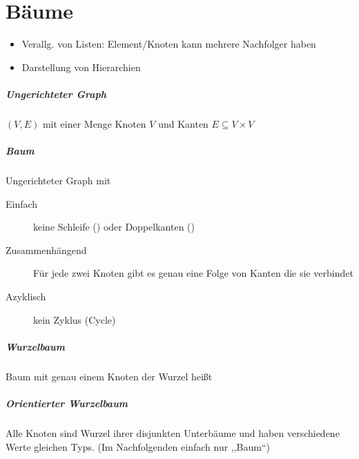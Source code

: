 \chapter{Bäume}

\begin{itemize}
  \item Verallg. von Listen: Element/Knoten kann mehrere Nachfolger haben
  \item Darstellung von Hierarchien
\end{itemize}

\paragraph{Ungerichteter Graph}
$(V, E)$ mit einer Menge Knoten $V$ und Kanten $E \subseteq V \times V$

\paragraph{Baum}
Ungerichteter Graph mit

\begin{description}
  \item [Einfach] keine Schleife () oder Doppelkanten ()

  \item [Zusammenhängend]
        Für jede zwei Knoten gibt es genau eine Folge von Kanten die sie verbindet

  \item [Azyklisch]
        kein Zyklus (Cycle)
\end{description}

\paragraph{Wurzelbaum}
Baum mit genau einem Knoten der Wurzel hei\ss t

\paragraph{Orientierter Wurzelbaum}
Alle Knoten sind Wurzel ihrer disjunkten Unterbäume und haben verschiedene Werte gleichen Typs. (Im Nachfolgenden einfach nur ,,Baum``)


